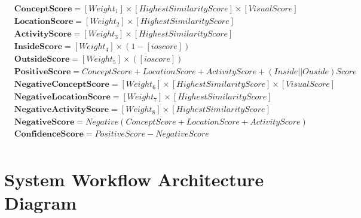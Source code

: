\begin{align*}
    &\textbf{ConceptScore}  =   [Weight_1]\times[HighestSimilarityScore]\times[VisualScore] \\ 
    &\textbf{LocationScore} = [Weight_2]\times[HighestSimilarityScore] \\ 
   &\textbf{ActivityScore} =  [Weight_3]\times[HighestSimilarityScore]\\
    &\textbf{InsideScore}   =  [Weight_4]\times(1-[ioscore])\\
    &\textbf{OutsideScore}  =  [Weight_5]\times([ioscore])\\
    &\textbf{PositiveScore}  =  ConceptScore + LocationScore + ActivityScore + (Inside||Ouside)Score\\
    &\textbf{NegativeConceptScore}  =  [Weight_6]\times[HighestSimilarityScore]\times[VisualScore]\\
    &\textbf{NegativeLocationScore}  =  [Weight_7]\times[HighestSimilarityScore]\\
    &\textbf{NegativeActivityScore}  =  [Weight_8]\times[HighestSimilarityScore]\\
    &\textbf{NegativeScore}  =  Negative(ConceptScore + LocationScore + ActivityScore) \\
    &\textbf{ConfidenceScore}  =  PositiveScore - NegativeScore\\
\end{align*}





\newpage


\section{System Workflow Architecture Diagram}
\label{sec:diagram}
   

